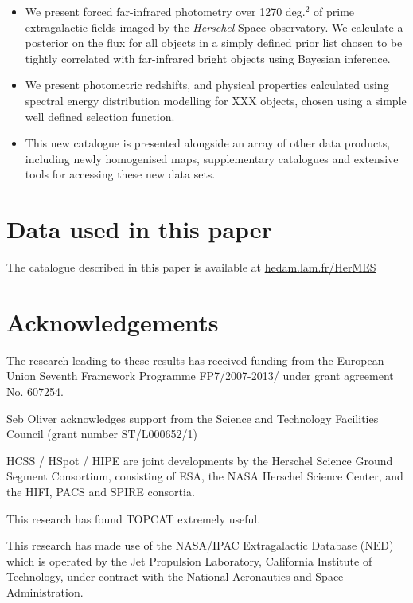 \documentclass[usenatbib]{mnras}
\begin{document}
\begin{itemize}
\item We present forced far-infrared photometry over 1270 deg.$^2$ of prime extragalactic fields imaged by the \emph{Herschel} Space observatory. We calculate a posterior on the flux for all objects in a simply defined prior list chosen to be tightly correlated with far-infrared bright objects using Bayesian inference. 
\item We present photometric redshifts, and physical properties calculated using spectral energy distribution modelling for XXX objects, chosen using a simple well defined selection function. 
\item This new catalogue is presented alongside an array of other data products, including newly homogenised maps, supplementary catalogues and extensive tools for accessing these new data sets.
\end{itemize}



\section*{Data used in this paper}

The catalogue described in this paper is available at \url{hedam.lam.fr/HerMES}



\section*{Acknowledgements}


The research leading to these results has received funding from the European
Union Seventh Framework Programme FP7/2007-2013/ under grant agreement No.
607254.


Seb Oliver acknowledges support from the Science and Technology Facilities
Council (grant number ST/L000652/1)


HCSS / HSpot / HIPE are joint developments by the Herschel Science Ground
Segment Consortium, consisting of ESA, the NASA Herschel Science Center, and the
HIFI, PACS and SPIRE consortia.

This research has found TOPCAT \citep{2005ASPC..347...29T} extremely useful.

This research has made use of the NASA/IPAC Extragalactic Database (NED) which
is operated by the Jet Propulsion Laboratory, California Institute of
Technology, under contract with the National Aeronautics and Space
Administration.
\end{document}
